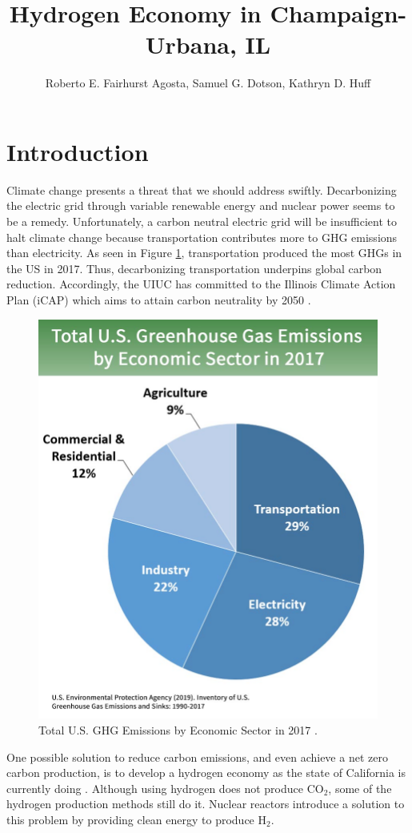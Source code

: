 \documentclass{anstrans}
\title{Hydrogen Economy in Champaign-Urbana, IL}
\author{Roberto E. Fairhurst Agosta, Samuel G. Dotson, Kathryn D. Huff}
\institute{
University of Illinois at Urbana-Champaign, Dept. of Nuclear, Plasma, and Radiological Engineering\\
ref3@illinois.edu
}
\begin{document}
\section{Introduction}

Climate change presents a threat that we should address swiftly. Decarbonizing the electric grid through variable renewable energy and nuclear power seems to be a remedy. Unfortunately, a carbon neutral electric grid will be insufficient to halt climate change because transportation contributes more to \gls{GHG} emissions than electricity. As seen in Figure \ref{fig:ghg}, transportation produced the most \glspl{GHG} in the US in 2017. Thus, decarbonizing transportation underpins global carbon reduction. Accordingly, the \gls{UIUC} has committed to the Illinois Climate Action Plan (iCAP) which aims to attain carbon neutrality by 2050 \cite{noauthor_illlinois_2015}.

\begin{figure}[H]
	\centering
	\includegraphics[width=0.6\linewidth]{figures/total-ghg-2019-caption.jpg}
	\hfill
	\caption{Total U.S. GHG Emissions by Economic Sector in 2017 \cite{us_epa_sources_2020}.}
	\label{fig:ghg}
\end{figure}

One possible solution to reduce carbon emissions, and even achieve a net zero carbon production, is to develop a hydrogen economy as the state of California is currently doing \cite{brown_economic_2013}. Although using hydrogen does not produce CO$_2$, some of the hydrogen production methods still do it. Nuclear reactors introduce a solution to this problem by providing clean energy to produce H$_2$.
\end{document}
